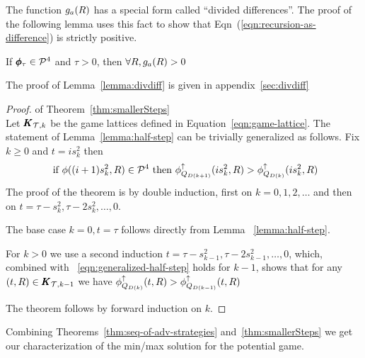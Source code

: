 \documentclass[anon,12pt]{colt2024} %
\begin{document}
The function $g_a(R)$ has a special form called ``divided
differences''. The proof of the following lemma uses this fact to show that 
Eqn~(\ref{eqn:recursion-as-difference}) is strictly positive.
\begin{lemma} \label{lemma:divdiff}
If $\pmb{\phi}_{\tau} \in {\cal P}^{4}$ and $\tau>0$, then $\forall R, g_a(R)>0$
\end{lemma}
The proof of Lemma~\ref{lemma:divdiff} is given in appendix~\ref{sec:divdiff}

\begin{proof}  of Theorem~\ref{thm:smallerSteps} \\

Let $ \pmb{K}_{{\mathcal{T},k}}$ be the game lattices defined in
Equation~\ref{eqn:game-lattice}. The statement of
Lemma~\ref{lemma:half-step} can be trivially generalized as follows. Fix $k\geq 0$ and $t=i s_k^2$
then 
\begin{equation} \label{eqn:generalized-half-step}
  \mbox{ if } \phi((i+1) s_k^2,R) \in {\cal P}^{4} \mbox{ then }
  \phi_{Q_{D(k+1)}}^{\uparrow}(i s_k^2,R) >  \phi_{Q_{D(k)}}^{\uparrow}(i s_k^2,R)
\end{equation}
The proof of the theorem is by double induction, first on $k=0,1,2,\ldots$ and then on
$t=\tau-s_k^2,\tau-2s_k^2,\ldots,0$.

The base case $k=0,t=\tau$ follows directly from Lemma ~\ref{lemma:half-step}.

For $k>0$ we use a second induction $t=\tau-s_{k-1}^2,\tau-2s_{k-1}^2,\ldots,0$, which, combined with 
~\ref{eqn:generalized-half-step} holds for $k-1$, shows that for any $(t,R) \in \pmb{K}_{{\mathcal{T},k-1}}$
we have $ \phi_{Q_{D(k)}}^{\uparrow}(t,R) >  \phi_{Q_{D(k-1)}}^{\uparrow}(t,R)$


The theorem follows by forward induction on $k$.
\end{proof}

Combining Theorems~\ref{thm:seq-of-adv-strategies}
and~\ref{thm:smallerSteps} we get our characterization of the min/max
solution for the potential game.
\end{document}

